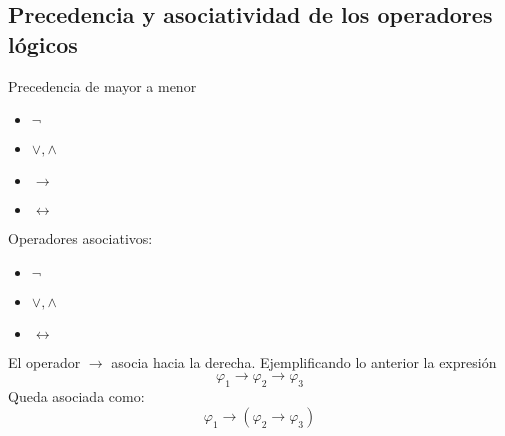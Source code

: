\documentclass[a4paper]{article}
\begin{document}
\subsection{Precedencia y asociatividad de los operadores lógicos}
Precedencia de mayor a menor
\begin{itemize}
    \item \(\neg\)
    \item \(\lor, \land\)
    \item \(\rightarrow\)
    \item \(\leftrightarrow\)
\end{itemize}
Operadores asociativos:
\begin{itemize}
    \item \(\neg\)
    \item \(\lor, \land\)
    \item \(\leftrightarrow\)
\end{itemize}
El operador \(\rightarrow\) asocia hacia la derecha.
\newline 
Ejemplificando lo anterior la expresión
\[
    \varphi_{1} \rightarrow \varphi_{2} \rightarrow \varphi_{3}  
\]
Queda asociada como:
\[
    \varphi_{1} \rightarrow \left(\varphi_{2} \rightarrow \varphi_{3}\right)  
\]
\end{document}
